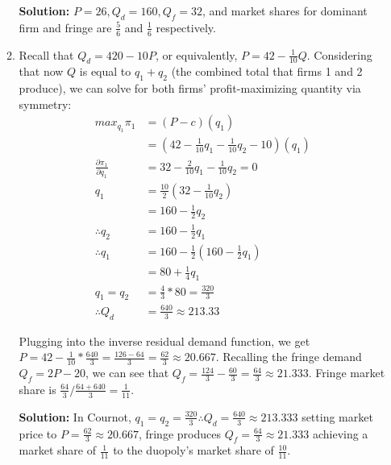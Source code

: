 \documentclass[12pt,letterpaper]{article}
\begin{document}
\begin{enumerate}
\begin{enumerate}
	{\color{blue}\textbf{Solution:} $P = 26, Q_d = 160, Q_f = 32$, and market shares for dominant firm and fringe are $\frac{5}{6}$ and $\frac{1}{6}$ respectively.}
	\item Recall that $Q_d = 420 - 10P$, or equivalently, $P = 42 - \frac{1}{10}Q$. Considering that now $Q$ is equal to $q_1 + q_2$ (the combined total that firms 1 and 2 produce), we can solve for both firms' profit-maximizing quantity via symmetry:
	\begin{align*}
		max_{q_1} \pi_1 &= (P - c)(q_1) \\
		&= (42 - \frac{1}{10}q_1 - \frac{1}{10}q_2 - 10)(q_1) \\
		\frac{\partial \pi_1}{\partial q_1} &= 32 - \frac{2}{10}q_1 - \frac{1}{10}q_2 = 0 \\
		q_1 &= \frac{10}{2} (32 - \frac{1}{10}q_2) \\
		&= 160 - \frac{1}{2}q_2 \\
		\therefore q_2 &= 160 - \frac{1}{2}q_1 \\
		\therefore q_1 &= 160 - \frac{1}{2}(160 - \frac{1}{2}q_1) \\
		&= 80 + \frac{1}{4}q_1 \\
		q_1 = q_2 &= \frac{4}{3} *80 = \frac{320}{3} \\
		\therefore Q_d &= \frac{640}{3} \approx 213.33
	\end{align*}

	Plugging into the inverse residual demand function, we get $P = 42 - \frac{1}{10} * \frac{640}{3} = \frac{126 - 64}{3} = \frac{62}{3} \approx 20.667$. Recalling the fringe demand $Q_f = 2P-20$, we can see that $Q_f = \frac{124}{3} - \frac{60}{3} = \frac{64}{3} \approx 21.333$. Fringe market share is $\frac{64}{3} / \frac{64 + 640}{3} = \frac{1}{11}$.


	{\color{blue}\textbf{Solution:} In Cournot, $q_1 = q_2 = \frac{320}{3} \therefore Q_d = \frac{640}{3} \approx 213.333$ setting market price to $P=\frac{62}{3} \approx 20.667$, fringe produces $Q_f = \frac{64}{3} \approx 21.333$ achieving a market share of $\frac{1}{11}$ to the duopoly's market share of $\frac{10}{11}$.}


\end{enumerate}
\end{enumerate}
\end{document}

